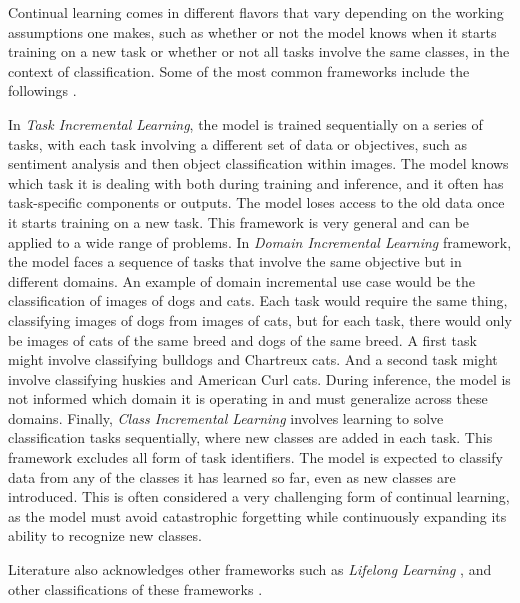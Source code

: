 \documentclass[11pt]{article}
\begin{document}
\vspace{2mm}
\noindent
Continual learning comes in different flavors that vary depending on the working assumptions one makes, such as whether or not the model knows when it starts training on a new task or whether or not all tasks involve the same classes, in the context of classification. Some of the most common frameworks include the followings \cite{frameworks_1_pMNIST_critic_1} \cite{EWC_7_frameworks_2}.

\vspace{2mm}
\noindent
In \textit{Task Incremental Learning}, the model is trained sequentially on a series of tasks, with each task involving a different set of data or objectives, such as sentiment analysis and then object classification within images. The model knows which task it is dealing with both during training and inference, and it often has task-specific components or outputs. The model loses access to the old data once it starts training on a new task. This framework is very general and can be applied to a wide range of problems. In \textit{Domain Incremental Learning} framework, the model faces a sequence of tasks that involve the same objective but in different domains. An example of domain incremental use case would be the classification of images of dogs and cats. Each task would require the same thing, classifying images of dogs from images of cats, but for each task, there would only be images of cats of the same breed and dogs of the same breed. A first task might involve classifying bulldogs and Chartreux cats. And a second task might involve classifying huskies and American Curl cats. During inference, the model is not informed which domain it is operating in and must generalize across these domains. Finally, \textit{Class Incremental Learning} involves learning to solve classification tasks sequentially, where new classes are added in each task. This framework excludes all form of task identifiers. The model is expected to classify data from any of the classes it has learned so far, even as new classes are introduced. This is often considered a very challenging form of continual learning, as the model must avoid catastrophic forgetting while continuously expanding its ability to recognize new classes.

\vspace{2mm}
\noindent
Literature also acknowledges other frameworks such as \textit{Lifelong Learning} \cite{review2}\cite{review3}\cite{frameworks_3_lifelong_DEN}, and other classifications of these frameworks \cite{review1}\cite{review4}.
\end{document}
